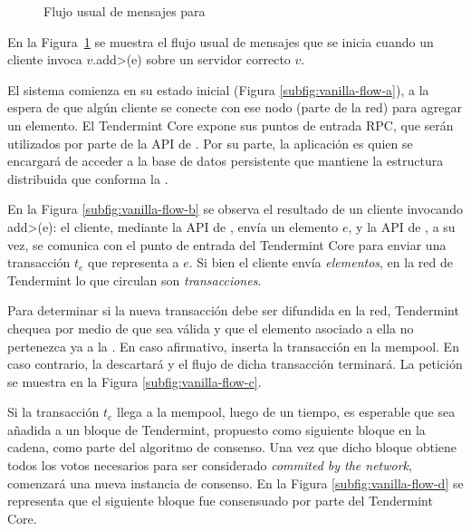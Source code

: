 \begin{figure}
  \caption{Flujo usual de mensajes para \vanilla}
  \label{fig:vanilla-flow}
\end{figure}

En la Figura~\ref{fig:vanilla-flow} se muestra el flujo usual de mensajes que se inicia
cuando un cliente invoca $v.$\<add>(e) sobre un servidor correcto $v$.
%

El sistema comienza en su estado inicial (Figura \ref{subfig:vanilla-flow-a}), a la espera de que algún cliente
se conecte con ese nodo (parte de la red) para agregar un elemento.
El Tendermint Core expone sus puntos de entrada RPC, que serán utilizados por parte de la API de
\setchain. Por su parte, la aplicación es quien se encargará de acceder a la base de datos persistente que
mantiene la estructura distribuida que conforma la \setchain.
%

En la Figura \ref{subfig:vanilla-flow-b} se observa el resultado de un cliente invocando \<add>(e): el cliente, mediante
la API de \setchain, envía un elemento $e$, y la API de \setchain, a su vez, se comunica con el
punto de entrada del Tendermint Core para enviar una transacción $t_e$ que representa a $e$.
Si bien el cliente envía \textit{elementos}, en la red de Tendermint
lo que circulan son \textit{transacciones}.
%

Para determinar si la nueva transacción debe ser difundida en la red, Tendermint chequea por medio de \CheckTx
que sea válida y que el elemento asociado a ella no pertenezca ya a la \setchain.
En caso afirmativo, inserta la transacción en la mempool.
En caso contrario, la descartará y el flujo de dicha transacción terminará.
La petición \CheckTx se muestra en la Figura \ref{subfig:vanilla-flow-c}.

%
Si la transacción $t_e$ llega a la mempool, luego de un tiempo, es esperable que sea añadida a un
bloque de Tendermint, propuesto como siguiente bloque en la cadena, como parte del algoritmo de
consenso.
Una vez que dicho bloque obtiene todos los votos necesarios para ser considerado
\textit{commited by the network}, comenzará una nueva instancia de consenso. En la Figura \ref{subfig:vanilla-flow-d}
se representa que el siguiente bloque fue consensuado por parte del Tendermint Core.

